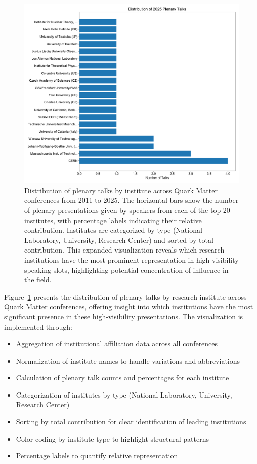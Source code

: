 \documentclass[a4paper,11pt]{article}
\begin{document}
\begin{figure}[H]
\centering
\includegraphics[width=\textwidth]{figures/plenary_talks_by_institute.pdf}
\caption{Distribution of plenary talks by institute across Quark Matter conferences from 2011 to 2025. The horizontal bars show the number of plenary presentations given by speakers from each of the top 20 institutes, with percentage labels indicating their relative contribution. Institutes are categorized by type (National Laboratory, University, Research Center) and sorted by total contribution. This expanded visualization reveals which research institutions have the most prominent representation in high-visibility speaking slots, highlighting potential concentration of influence in the field.}
\label{fig:institute_plenary}
\end{figure}

Figure~\ref{fig:institute_plenary} presents the distribution of plenary talks by research institute across Quark Matter conferences, offering insight into which institutions have the most significant presence in these high-visibility presentations. The visualization is implemented through:

\begin{itemize}
    \item Aggregation of institutional affiliation data across all conferences
    \item Normalization of institute names to handle variations and abbreviations
    \item Calculation of plenary talk counts and percentages for each institute
    \item Categorization of institutes by type (National Laboratory, University, Research Center)
    \item Sorting by total contribution for clear identification of leading institutions
    \item Color-coding by institute type to highlight structural patterns
    \item Percentage labels to quantify relative representation
\end{itemize}
\end{document}
